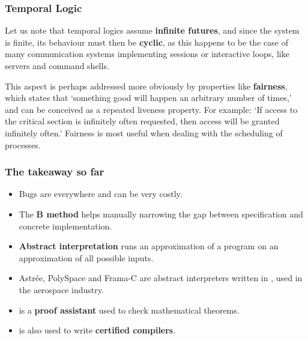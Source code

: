 \documentclass[compress,dvipdfmx]{beamer}
\begin{document}
\begin{frame}
  \frametitle{Temporal Logic}

  Let us note that temporal logics assume \textbf{infinite futures},
  and since the system is finite, its behaviour must then be
  \textbf{cyclic}, as this happens to be the case of many
  communication systems implementing sessions or interactive loops,
  like servers and command shells.

  \bigskip

  This aspect is perhaps addressed more obviously by properties like
  \textbf{fairness}, which states that `something good will happen an
  arbitrary number of times,' and can be conceived as a repeated
  liveness property. For example: `If access to the critical section
  is infinitely often requested, then access will be granted
  infinitely often.' Fairness is most useful when dealing with the
  scheduling of processes.

\end{frame}

\begin{frame}
  \frametitle{The takeaway so far}

  \begin{itemize}

    \item Bugs are everywhere and can be very costly.

    \item The \textbf{B method} helps manually narrowing the gap
      between specification and concrete implementation.

    \item \textbf{Abstract interpretation} runs an approximation of a
      program on an approximation of all possible inputs.

    \item Astrée, PolySpace and Frama-C are abstract interpreters
      written in \OCaml, used in the aerospace industry.

    \item \Coq is a \textbf{proof assistant} used to check
      mathematical theorems.

    \item \Coq is also used to write \textbf{certified compilers}.

  \end{itemize}

\end{frame}
\end{document}

